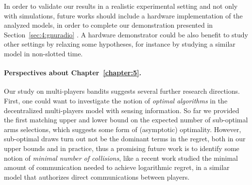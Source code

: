 

In order to validate our results in a realistic experimental setting and not only with simulations, future works should include a hardware implementation of the analyzed models, in order to complete our demonstration presented in Section~\ref{sec:4:gnuradio} \cite{Besson2018ICT,Besson2019WCNC}.
%
A hardware demonstrator could be also benefit to study other settings by relaxing some hypotheses, for instance by studying a similar model in non-slotted time.


\paragraph{Perspectives about \textbf{Chapter~\ref{chapter:5}}.}

Our study on multi-players bandits suggests several further research directions.
First, one could want to investigate the notion of \emph{optimal algorithms} in the decentralized multi-players model with sensing information.
So far we provided the first matching upper and lower bound on the expected number of sub-optimal arms selections, which suggests some form of (asymptotic) optimality.
However, sub-optimal draws turn out not be the dominant terms in the regret, both in our upper bounds and in practice, thus a promising future work is to identify some notion of \emph{minimal number of collisions}, like a recent work \cite{wang2019distributed} studied the minimal amount of communication needed to achieve logarithmic regret, in a similar model that authorizes direct communications between players.

